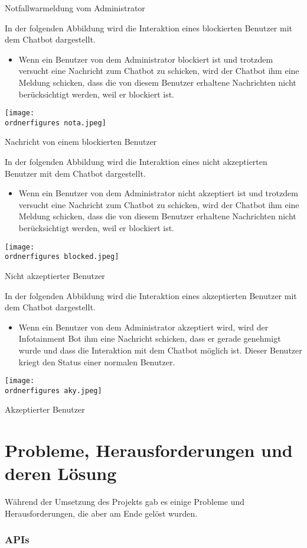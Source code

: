\caption{Notfallwarmeldung vom Administrator} 
\label{fig:chgf43}
In der folgenden Abbildung wird die Interaktion eines blockierten Benutzer mit dem Chatbot dargestellt.
\begin{itemize}
	\item Wenn ein Benutzer von dem Administrator blockiert ist und trotzdem versucht eine Nachricht zum Chatbot zu schicken, wird der Chatbot ihm eine Meldung schicken, dass die von diesem Benutzer erhaltene Nachrichten nicht ber\"ucksichtigt werden, weil er blockiert ist. 
\end{itemize}
\captionsetup{type=figure}
\texttt{[image: \\ordnerfigures nota.jpeg]}
\caption{Nachricht von einem blockierten Benutzer}
\label{fig:chatbodfsd53}
In der folgenden Abbildung wird die Interaktion eines nicht akzeptierten Benutzer mit dem Chatbot dargestellt.
\begin{itemize}
	\item Wenn ein Benutzer von dem Administrator nicht akzeptiert ist und trotzdem versucht eine Nachricht zum Chatbot zu schicken, wird der Chatbot ihm eine Meldung schicken, dass die von diesem Benutzer erhaltene Nachrichten nicht ber\"ucksichtigt werden, weil er blockiert ist. 
\end{itemize}
\captionsetup{type=figure}
\texttt{[image: \\ordnerfigures blocked.jpeg]}
\caption{Nicht akzeptierter Benutzer}
\label{fig:chatb6dfsd53}
In der folgenden Abbildung wird die Interaktion eines akzeptierten Benutzer mit dem Chatbot dargestellt.
\begin{itemize}
	\item Wenn ein Benutzer von dem Administrator akzeptiert wird, wird der Infotainment Bot ihm eine Nachricht schicken, dass er gerade genehmigt wurde und dass die Interaktion mit dem Chatbot m\"oglich ist. Dieser Benutzer kriegt den Status einer normalen Benutzer.
\end{itemize}
\captionsetup{type=figure}
\texttt{[image: \\ordnerfigures aky.jpeg]}
\caption{Akzeptierter Benutzer }
\label{fig:chatbodged53}
\section{Probleme, Herausforderungen und deren Lösung}
Während der Umsetzung des Projekts gab es einige Probleme und Herausforderungen, die aber am Ende gelöst wurden.
\subsubsection{APIs}

